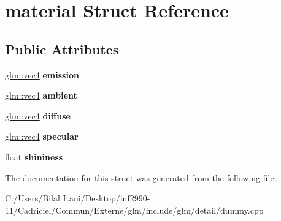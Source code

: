 \hypertarget{structmaterial}{}\section{material Struct Reference}
\label{structmaterial}
\subsection*{Public Attributes}
\begin{DoxyCompactItemize}
\item 
\hyperlink{group__core__types_ga5881b1b022d7fd1b7218f5916532dd02}{glm\+::vec4} {\bfseries emission}\hypertarget{structmaterial_a76b696726a2ea73e6840001821942bc3}{}\label{structmaterial_a76b696726a2ea73e6840001821942bc3}

\item 
\hyperlink{group__core__types_ga5881b1b022d7fd1b7218f5916532dd02}{glm\+::vec4} {\bfseries ambient}\hypertarget{structmaterial_a944296102e90b1610967530458f40ba1}{}\label{structmaterial_a944296102e90b1610967530458f40ba1}

\item 
\hyperlink{group__core__types_ga5881b1b022d7fd1b7218f5916532dd02}{glm\+::vec4} {\bfseries diffuse}\hypertarget{structmaterial_a506a0cc33282fa76872c6aeebd688b39}{}\label{structmaterial_a506a0cc33282fa76872c6aeebd688b39}

\item 
\hyperlink{group__core__types_ga5881b1b022d7fd1b7218f5916532dd02}{glm\+::vec4} {\bfseries specular}\hypertarget{structmaterial_a452d07b4570da7204caeaf798cd01a77}{}\label{structmaterial_a452d07b4570da7204caeaf798cd01a77}

\item 
float {\bfseries shininess}\hypertarget{structmaterial_aa3740fd7908ec5a11bbc4a4bd5b21abc}{}\label{structmaterial_aa3740fd7908ec5a11bbc4a4bd5b21abc}

\end{DoxyCompactItemize}


The documentation for this struct was generated from the following file\+:\begin{DoxyCompactItemize}
\item 
C\+:/\+Users/\+Bilal Itani/\+Desktop/inf2990-\/11/\+Cadriciel/\+Commun/\+Externe/glm/include/glm/detail/dummy.\+cpp\end{DoxyCompactItemize}
